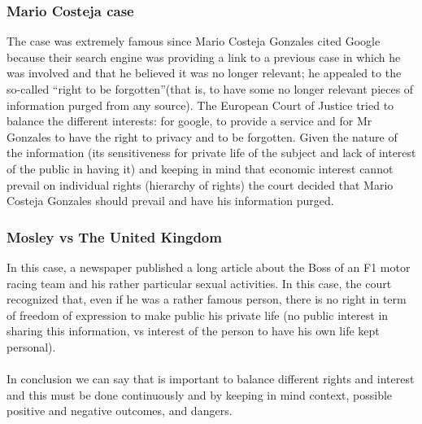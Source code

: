 \subsubsection{Mario Costeja case}
The case was extremely famous since
Mario Costeja Gonzales cited Google because their search engine was providing a link to a
previous case in which he was involved and that he believed it was no longer relevant; he
appealed to the so-called “right to be forgotten”(that is, to have some no longer relevant
pieces of information purged from any source). The European Court of Justice tried to
balance the different interests: for google, to provide a service and for Mr Gonzales to have
the right to privacy and to be forgotten. Given the nature of the information (its sensitiveness for private life of the subject and lack
of interest of the public in having it) and keeping in mind that economic interest cannot
prevail on individual rights (hierarchy of rights) the court decided that Mario Costeja
Gonzales should prevail and have his information purged.
\subsubsection{Mosley vs The United Kingdom}
In this case, a newspaper published a long article about the Boss of an F1 motor racing team and his
rather particular sexual activities. In this case, the court recognized that, even if he was a
rather famous person, there is no right in term of freedom of expression to make public his
private life (no public interest in sharing this information, vs interest of the person to have
his own life kept personal).\\ \\
In conclusion we can say that is important to balance different rights and interest and this must be done continuously and by keeping in mind context, possible positive and negative outcomes, and dangers.
